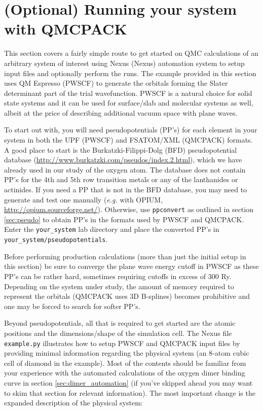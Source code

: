 \section{(Optional) Running your system with QMCPACK}\label{sec:your_system}
This section covers a fairly simple route to get started on QMC calculations of an arbitrary system of interest using Nexus (Nexus) automation system to setup input files and optionally perform the runs.  The example provided in this section uses QM Espresso (PWSCF) to generate the orbitals forming the Slater determinant part of the trial wavefunction.  PWSCF is a natural choice for solid state systems and it can be used for surface/slab and molecular systems as well, albeit at the price of describing additional vacuum space with plane waves.

To start out with, you will need pseudopotentials (PP's) for each element in your system in both the UPF (PWSCF) and FSATOM/XML (QMCPACK) formats.  A good place to start is the Burkatzki-Filippi-Dolg (BFD) pseudopotential database \newline (\href{http://www.burkatzki.com/pseudos/index.2.html}{http://www.burkatzki.com/pseudos/index.2.html}), which we have already used in our study of the oxygen atom.  The database does not contain PP's for the 4th and 5th row transition metals or any of the lanthanides or actinides.  If you need a PP that is not in the BFD database, you may need to generate and test one manually (\emph{e.g.} with OPIUM, \href{http://opium.sourceforge.net/}{http://opium.sourceforge.net/}).  Otherwise, use \texttt{ppconvert} as outlined in section \ref{sec:pseudo} to obtain PP's in the formats used by PWSCF and QMCPACK.  Enter the \texttt{your\_system} lab directory and place the converted PP's in \texttt{your\_system/pseudopotentials}.

Before performing production calculations (more than just the initial setup in this section) be sure to converge the plane wave energy cutoff in PWSCF as these PP's can be rather hard, sometimes requiring cutoffs in excess of 300 Ry.  Depending on the system under study, the amount of memory required to represent the orbitals (QMCPACK uses 3D B-splines) becomes prohibitive and one may be forced to search for softer PP's.

Beyond pseudopotentials, all that is required to get started are the atomic positions and the dimensions/shape of the simulation cell.  The Nexus file \texttt{example.py} illustrates how to setup PWSCF and QMCPACK input files by providing minimal information regarding the physical system (an 8-atom cubic cell of diamond in the example).  Most of the contents should be familiar from your experience with the automated calculations of the oxygen dimer binding curve in section \ref{sec:dimer_automation} (if you've skipped ahead you may want to skim that section for relevant information).  The most important change is the expanded description of the physical system:

